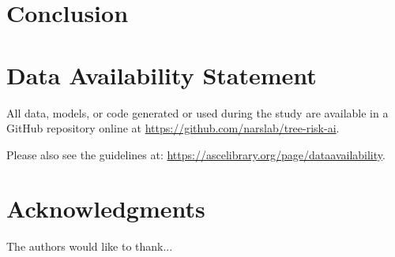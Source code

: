 \documentclass[Journal,letterpaper, SingleSpace, InsideFigs]{ascelike-new}
\begin{document}


\section{Conclusion}

\section{Data Availability Statement}
All data, models, or code generated or used during the study are available in a GitHub repository online at \url{https://github.com/narslab/tree-risk-ai}.

Please also see the guidelines at: \url{https://ascelibrary.org/page/dataavailability}.

\section{Acknowledgments}
The authors would like to thank...

\appendix

\eject
   
\end{document}
